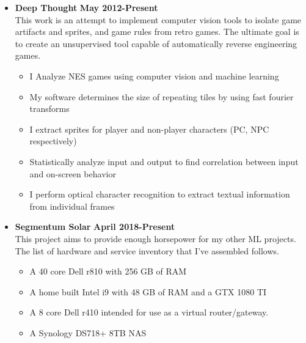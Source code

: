 \documentclass[overlapped]{res}
\begin{document}
\begin{resume}
\begin{itemize}[leftmargin=0in]
        \begin{itemize}[leftmargin=0in]
            \item[] 
                \begin{samepage}
                    \textbf{Deep Thought} \hfill \textbf{May 2012-Present} \\
                    This work is an attempt to implement computer vision tools to isolate game artifacts and 
                    sprites, and game rules from retro games. The ultimate goal is to create an unsupervised tool capable of automatically 
                    reverse engineering games.
                    \begin{itemize}
                        \item[\textbullet] I Analyze NES games using computer vision and machine learning
                        \item[\textbullet] My software determines the size of repeating tiles by using fast fourier transforms
                        \item[\textbullet] I extract sprites for player and non-player characters (PC, NPC respectively)
                        \item[\textbullet] Statistically analyze input and output to find correlation between input and on-screen behavior
                        \item[\textbullet] I perform optical character recognition to extract textual information from individual frames
                    \end{itemize}
                \end{samepage}
            \item[] 
                \begin{samepage}
                    \textbf{Segmentum Solar} \hfill \textbf{April 2018-Present} \\
                    This project aims to provide enough horsepower for my other ML projects. The list of hardware and service inventory that I've assembled follows.
                    \begin{itemize}
                        \item[\textbullet] A 40 core Dell r810 with 256 GB of RAM
                        \item[\textbullet] A home built Intel i9 with 48 GB of RAM and a GTX 1080 TI
                        \item[\textbullet] A 8 core Dell r410 intended for use as a virtual router/gateway.
                        \item[\textbullet] A Synology DS718+ 8TB NAS

\end{itemize}
\end{samepage}
\end{itemize}
\end{itemize}
\end{resume}
\end{document}
